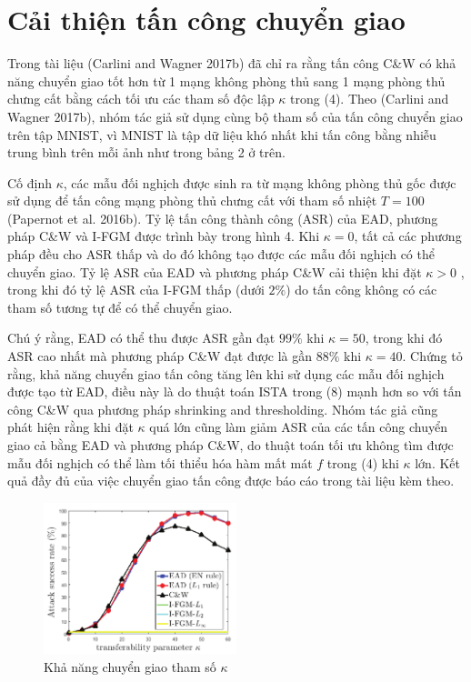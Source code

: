 \section{Cải thiện tấn công chuyển giao}
Trong tài liệu (Carlini and Wagner 2017b) đã chỉ ra rằng tấn công C\&W có khả năng chuyển giao tốt hơn  từ 1 mạng không phòng thủ sang 1 mạng phòng thủ chưng cất bằng cách tối ưu các tham số độc lập $\kappa$ trong (4). Theo (Carlini and Wagner 2017b), nhóm tác giả sử dụng cùng bộ tham số của tấn công chuyển giao trên tập MNIST, vì MNIST là tập dữ liệu khó nhất khi tấn công bằng nhiễu trung bình trên mỗi ảnh như trong bảng 2 ở trên.

Cố định $\kappa$, các mẫu đối nghịch được sinh ra từ mạng không phòng thủ gốc được sử dụng để tấn công mạng phòng thủ chưng cất với tham số nhiệt $T = 100$ (Papernot et al. 2016b). Tỷ lệ tấn công thành công (ASR) của EAD, phương pháp C\&W và I-FGM được trình bày trong hình 4. Khi $\kappa = 0$, tất cả các phương pháp đều cho ASR thấp và do đó không tạo được các mẫu đối nghịch có thể chuyển giao. Tỷ lệ ASR của EAD và phương pháp C\&W cải thiện khi đặt $\kappa > 0$ , trong khi đó tỷ lệ ASR của I-FGM thấp (dưới $2\%$) do tấn công không có các tham số tương tự để có thể chuyển giao.

Chú ý rằng, EAD có thể thu được ASR gần đạt $99\%$ khi $\kappa = 50$, trong khi đó ASR cao nhất mà phương pháp C\&W đạt được là gần $88\%$ khi $\kappa = 40$. Chứng tỏ rằng, khả năng chuyển giao tấn công tăng lên khi sử dụng các mẫu đối nghịch được tạo từ EAD, điều này là do thuật toán ISTA trong (8) mạnh hơn so với tấn công C\&W qua phương pháp shrinking and thresholding. Nhóm tác giả cũng phát hiện rằng khi đặt $\kappa$ quá lớn cũng làm giảm ASR của các tấn công chuyển giao cả bằng EAD và phương pháp C\&W, do thuật toán tối ưu không tìm được mẫu đối nghịch có thể làm tối thiểu hóa hàm mất mát $f$ trong (4) khi $\kappa$ lớn. Kết quả đầy đủ của việc chuyển giao tấn công được báo cáo trong tài liệu kèm theo.

\begin{figure}[H] %
    \centering %
    \includegraphics[width=0.5\textwidth]{assets/fig_04.png} 
    \caption{Khả năng chuyển giao tham số $\kappa$} %
    \label{fig:fg_04}
\end{figure}